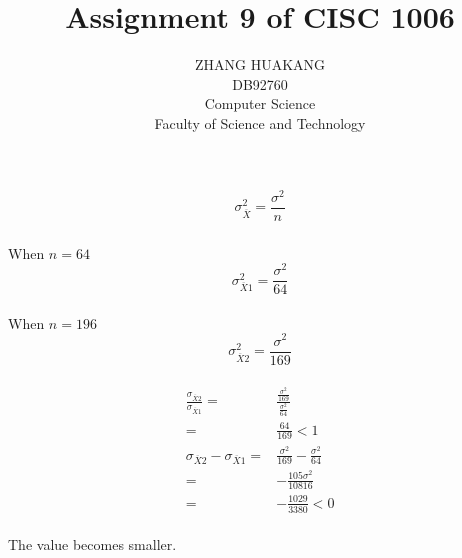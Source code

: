 \documentclass{article}
\title{Assignment 9 of CISC 1006}
\author{ZHANG HUAKANG \\ DB92760 \\Computer Science \\Faculty of Science and Technology}
\begin{document}
    \maketitle
    \section{} 
        \subsection{}
            $$\sigma_{\overline{X}}^2=\frac{\sigma^2}{n}$$
            \subsubsection{}
                \paragraph{}
                When $n=64$
                $$\sigma_{\overline{X}1}^2=\frac{\sigma^2}{64}$$
                \paragraph{}
                When $n=196$
                $$\sigma_{\overline{X}2}^2=\frac{\sigma^2}{169}$$
                \paragraph{}
                \begin{equation*}
                    \begin{split}
                        \frac{\sigma_{\overline{X}2}}{\sigma_{\overline{X}1}}=&\frac{\frac{\sigma^2}{169}}{\frac{\sigma^2}{64}}\\
                            =&\frac{64}{169}<1\\
                        \sigma_{\overline{X}2}-\sigma_{\overline{X}1}=&\frac{\sigma^2}{169}-\frac{\sigma^2}{64}\\
                            =&-\frac{105\sigma^2}{10816}\\
                            =&-\frac{1029}{3380}<0
                    \end{split}
                \end{equation*}
                \paragraph{}
                The value becomes smaller.
\end{document}

